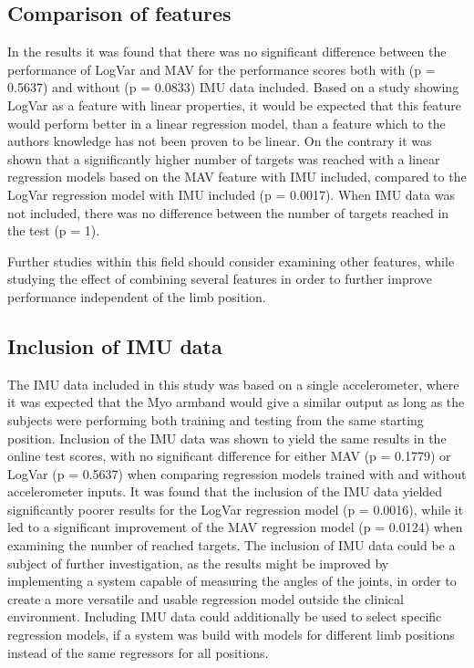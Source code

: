 \subsection{Comparison of features}
In the results it was found that there was no significant difference between the performance of LogVar and MAV for the performance scores both with (p = 0.5637) and without (p = 0.0833) IMU data included. Based on a study \cite{hahne2014} showing LogVar as a feature with linear properties, it would be expected that this feature would perform better in a linear regression model, than a feature which to the authors knowledge has not been proven to be linear. On the contrary it was shown that a significantly higher number of targets was reached with a linear regression models based on the MAV feature with IMU included, compared to the LogVar regression model with IMU included (p = 0.0017). When IMU data was not included, there was no difference between the number of targets reached in the test (p = 1).

Further studies within this field should consider examining other features, while studying the effect of combining several features in order to further improve performance independent of the limb position.

\subsection{Inclusion of IMU data}
The IMU data included in this study was based on a single accelerometer, where it was expected that the Myo armband would give a similar output as long as the subjects were performing both training and testing from the same starting position. Inclusion of the IMU data was shown to yield the same results in the online test scores, with no significant difference for either MAV (p = 0.1779) or LogVar (p = 0.5637) when comparing regression models trained with and without accelerometer inputs. It was found that the inclusion of the IMU data yielded significantly poorer results for the LogVar regression model (p = 0.0016), while it led to a significant improvement of the MAV regression model (p = 0.0124) when examining the number of reached targets. The inclusion of IMU data could be a subject of further investigation, as the results might be improved by implementing a system capable of measuring the angles of the joints, in order to create a more versatile and usable regression model outside the clinical environment. Including IMU data could additionally be used to select specific regression models, if a system was build with models for different limb positions instead of the same regressors for all positions.

